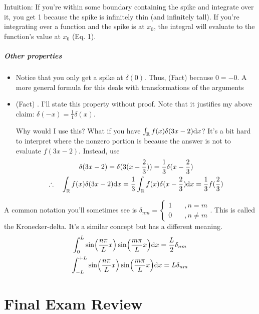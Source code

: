 Intuition: If you're within some boundary containing the spike and integrate over it, you get 1 because the spike is infinitely thin (and infinitely tall). If you're integrating over a function and the spike is at $x_0$, the integral will evaluate to the function's value at $x_0$ (Eq. 1).

\paragraph*{Other properties}
\begin{itemize}
  \item  Notice that you only get a spike at $\delta(0)$.  Thus, (Fact)  because $0 = -0$. A more general formula for this deals with transformations of the arguments
  \item (Fact) . I'll state this property without proof. Note that it justifies my above claim: $\delta(-x) = \frac{1}{1} \delta (x) $.  
  
  Why would I use this? What if you have $\int_\mathbb{R} f(x)  \delta(3x - 2) \text{d} x  $? It's a bit hard to interpret where the nonzero portion is because the answer is not to evaluate $f(3x-2)$. Instead, use 
  \begin{gather*}
    \delta(3x - 2) = \delta (3 (x - \frac{2}{3})) = \frac{1}{3} \delta(x - \frac{2}{3}) \\ 
    \therefore \quad 
    \int_\mathbb{R} f(x)  \delta(3x - 2) \text{d} x  
    = \frac{1}{3}\int_\mathbb{R} f(x)  \delta(x - \frac{2}{3}) \text{d} x = \frac{1}{3} f(\frac{2}{3})  
  \end{gather*}
\end{itemize} 

A common notation you'll sometimes see is $\delta_{nm} = \begin{cases}
  1 \quad &, n = m \\ 0 \quad &,  n \neq m 
\end{cases}$. This is called the Kronecker-delta. It's a similar concept but has a different meaning. 
\begin{gather*}
  \int_0^L \sin(\frac{n\pi}{L} x) \sin(\frac{m\pi}{L} x) \text{d} x = \frac{L}{2} \delta_{nm} \\
  \int_{-L}^{+L} \sin(\frac{n\pi}{L} x) \sin(\frac{m\pi}{L} x) \text{d} x = L \delta_{nm}
\end{gather*}


\chapter{Final Exam Review}

